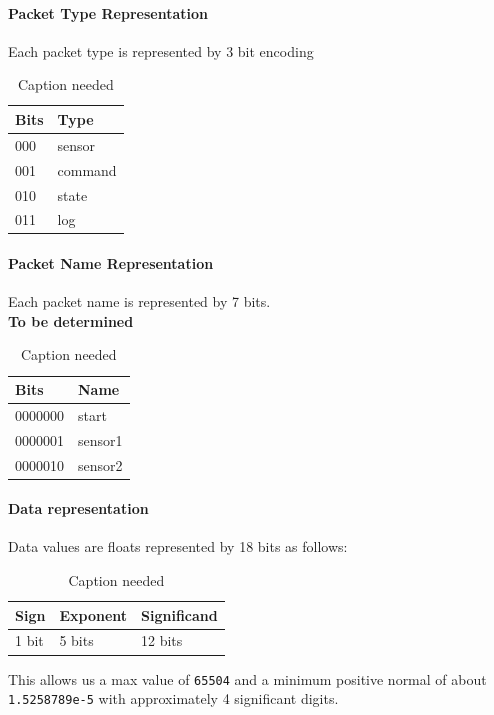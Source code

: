 \documentclass[main.tex]{subfiles}
\begin{document}
    \paragraph{Packet Type Representation}
    Each packet type is represented by 3 bit encoding
    \begin{table}[H]
        \centering
        \begin{tabular}{@{}ll@{}} \toprule
            Bits & Type\\ \midrule
            000 & sensor\\
            001 & command\\
            010 & state\\
            011 & log\\ \bottomrule
        \end{tabular}
        \caption{Caption needed}
    \end{table}

    \paragraph{Packet Name Representation}
    Each packet name is represented by 7 bits.\\
    \textbf{To be determined}
    \begin{table}[H]
        \centering
        \begin{tabular}{@{}ll@{}} \toprule
            Bits & Name\\ \midrule
            0000000 & start\\
            0000001 & sensor1\\
            0000010 & sensor2\\ \bottomrule
        \end{tabular}
        \caption{Caption needed}
    \end{table}

    \paragraph{Data representation}
    Data values are floats represented by 18 bits as follows:
    \begin{table}[H]
        \centering
        \begin{tabular}{@{}lll@{}} \toprule
            Sign & Exponent & Significand\\ \midrule
            1 bit & 5 bits & 12 bits\\ \bottomrule
        \end{tabular}
        \caption{Caption needed}
    \end{table}
    This allows us a max value of \verb|65504| and a minimum positive normal of about \verb|1.5258789e-5| with approximately 4 significant digits.
\end{document}
